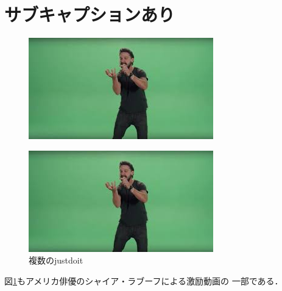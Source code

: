 \documentclass[a4j]{jarticle}
\begin{document}
\section{サブキャプションあり}
\begin{figure}[htbp]
    \begin{minipage}[b]{0.45\linewidth}
        \centering
        \includegraphics[keepaspectratio, scale=0.5]{justdoit.jpg}
        \label{justdoit3}
    \end{minipage}
    \begin{minipage}[b]{0.45\linewidth}
        \centering
        \includegraphics[keepaspectratio, scale=0.5]{justdoit.jpg}
    \end{minipage}
    \caption{複数のjustdoit}
\end{figure}
図\ref{justdoit3}もアメリカ俳優のシャイア・ラブーフによる激励動画の
一部である．
\end{document}
